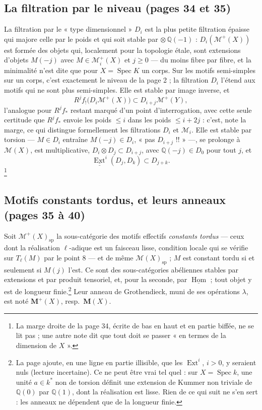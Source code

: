 \documentclass[11pt,a4paper]{article}
\begin{document}
\subsection*{La filtration par le niveau (pages 34 et 35)}

La filtration par le « type dimensionnel » $D_{i}$ est la plus petite filtration
épaisse qui majore celle par le poids et qui soit stable par $\otimes\,
\mathbb{Q}(-1)$ : $D_{i}(\mathcal{M}^{+}(X))$ est formée des objets qui, localement
pour la topologie étale, sont extensions d'objets $M(-j)$ avec $M \in
\mathcal{M}^{+}_{i}(X)$ et $j \geqslant 0$ --- du moins fibre par fibre, et
la minimalité n'est dite que pour $X = \operatorname{Spec} K$ un corps. Sur les motifs semi-simples sur un
corps, c'est exactement le niveau de la page 2 ; la filtration $D_{i}$ l'étend aux
motifs qui ne sont plus semi-simples. Elle est stable par image inverse, et
\[
R^{j}f_{!}\bigl(D_{i}\mathcal{M}^{+}(X)\bigr) \subset D_{i+j}\mathcal{M}^{+}(Y) ,
\]
l'analogue pour $R^{j}f_{*}$ restant marqué d'un point d'interrogation, avec
cette seule certitude que $R^{j}f_{*}$ envoie les poids $\leqslant i$ dans les
poids $\leqslant i+2j$ : c'est, note la marge, ce qui distingue formellement
les filtrations $D_{i}$ et $\mathcal{M}_{i}$. Elle est stable par torsion --- $M \in D_{i}$ entraîne
$M(-j) \in D_{i}$, « pas $D_{i+j}$ !! » ---, se prolonge à $\mathcal{M}(X)$, est
multiplicative, $D_{i} \otimes D_{j} \subset D_{i+j}$, avec $\mathbb{Q}(-j) \in D_{0}$
pour tout $j$, et
\[
\underline{\underline{\operatorname{Ext}}}^{i}(D_{j}, D_{k}) \subset D_{j+k} .
\]\footnote{La marge droite de la page 34, écrite de bas en haut et en partie
biffée, ne se lit pas ; une autre note dit que tout doit se passer « en termes
de la dimension de $X$ ».}

\subsection*{Motifs constants tordus, et leurs anneaux (pages 35 à 40)}

Soit $\mathcal{M}^{+}(X)_{\mathrm{sp}}$ la sous-catégorie des motifs effectifs
\emph{constants tordus} --- ceux dont la réalisation $\ell$-adique est un faisceau
lisse, condition locale qui se vérifie sur $T_{\ell}(M)$ par le point 8 --- et de
même $\mathcal{M}(X)_{\mathrm{sp}}$ ; $M$ est constant tordu si et seulement si
$M(j)$ l'est. Ce sont des sous-catégories abéliennes stables par extensions et
par produit tensoriel, et, pour la seconde, par $\underline{\operatorname{Hom}}$ ;
tout objet y est de longueur finie.\footnote{La page ajoute, en une ligne en
partie illisible, que les $\operatorname{Ext}^{i}$, $i > 0$, y seraient nuls
(lecture incertaine). Ce ne peut être vrai tel quel : sur $X = \operatorname{Spec}
k$, une unité $a \in k^{*}$ non de torsion définit une extension de Kummer non
triviale de $\mathbb{Q}(0)$ par $\mathbb{Q}(1)$, dont la réalisation est lisse.
Rien de ce qui suit ne s'en sert : les anneaux ne dépendent que de la longueur
finie.} Leur anneau de Grothendieck, muni de ses opérations $\lambda$, est noté
$\mathbf{M}^{+}(X)$, resp.\ $\mathbf{M}(X)$.
\end{document}
